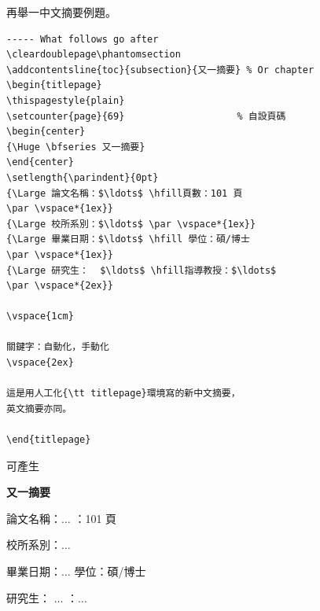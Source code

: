 \begin{appendB}
再舉一中文摘要例題。

\begin{Verbatim}[frame=single,firstline=1,lastline=30,rulecolor=\color{red},label=Another abstract]
----- What follows go after 
\cleardoublepage\phantomsection
\addcontentsline{toc}{subsection}{又一摘要} % Or chapter
\begin{titlepage}
\thispagestyle{plain}
\setcounter{page}{69}                    % 自設頁碼
\begin{center}
{\Huge \bfseries 又一摘要}
\end{center}
\setlength{\parindent}{0pt}
{\Large 論文名稱：$\ldots$ \hfill頁數：101 頁
\par \vspace*{1ex}}
{\Large 校所系別：$\ldots$ \par \vspace*{1ex}}
{\Large 畢業日期：$\ldots$ \hfill 學位：碩/博士 
\par \vspace*{1ex}}
{\Large 研究生：  $\ldots$ \hfill指導教授：$\ldots$ 
\par \vspace*{2ex}}

\vspace{1cm}

關鍵字：自動化，手動化
\vspace{2ex}

這是用人工化{\tt titlepage}環境寫的新中文摘要，
英文摘要亦同。

\end{titlepage}
\end{Verbatim}

可產生

\cleardoublepage{}
{}  %
\begin{titlepage}
\thispagestyle{plain}
\setcounter{page}{69}                                %
\begin{center}
{\Huge \bfseries 又一摘要}
\end{center}
\setlength{\parindent}{0pt}
{\Large 論文名稱：$\ldots$ ：101 頁
\par \vspace*{1ex}}
{\Large 校所系別：$\ldots$ \par \vspace*{1ex}}
{\Large 畢業日期：$\ldots$ \hfill 學位：碩/博士 \par \vspace*{1ex}}
{\Large 研究生：    $\ldots$ ：$\ldots$ \par \vspace*{2ex}}


\end{titlepage}
\end{appendB}
